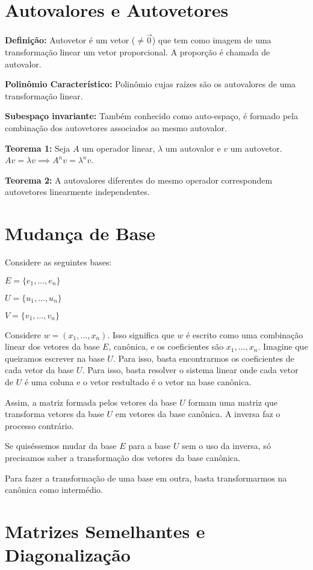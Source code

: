 \documentclass[12pt,letterpaper]{article}
\begin{document}
\section{Autovalores e Autovetores}

\textbf{Definição:} Autovetor é um vetor ($\neq \Vec{0}$) que tem como imagem de uma transformação linear um vetor proporcional. A proporção é chamada de autovalor. 

\textbf{Polinômio Característico:} Polinômio cujas raízes são os autovalores de uma transformação linear. 

\textbf{Subespaço invariante:} Também conhecido como auto-espaço, é formado pela combinação dos autovetores associados ao mesmo autovalor. 

\textbf{Teorema 1: } Seja $A$ um operador linear, $\lambda$ um autovalor e $v$ um autovetor. $Av = \lambda v \implies A^nv = \lambda^n v$.

\textbf{Teorema 2:} A autovalores diferentes do mesmo operador correspondem autovetores linearmente independentes. 

\section{Mudança de Base}

Considere as seguintes bases:

$E = \{e_1, ..., e_n\}$

$U = \{u_1, ..., u_n\}$

$V = \{v_1,...,v_n\}$

Considere $w = (x_1,...,x_n)$. Isso significa que $w$ é escrito como uma combinação linear dos vetores da base $E$, canônica, e os coeficientes são $x_1, ..., x_n$. Imagine que queiramos escrever na base $U$. Para isso, basta encontrarmos os coeficientes de cada vetor da base $U$. Para isso, basta resolver o sistema linear onde cada vetor de $U$ é uma coluna e o vetor restultado é o vetor na base canônica. 

Assim, a matriz formada pelos vetores da base $U$ formam uma matriz que transforma vetores da base $U$ em vetores da base canônica. A inversa faz o processo contrário. 

Se quiséssemos mudar da base $E$ para a base $U$ sem o uso da inversa, só precisamos saber a transformação dos vetores da base canônica. 

Para fazer a transformação de uma base em outra, basta transformarmos na canônica como intermédio. 

\section{Matrizes Semelhantes e Diagonalização}
\end{document}
